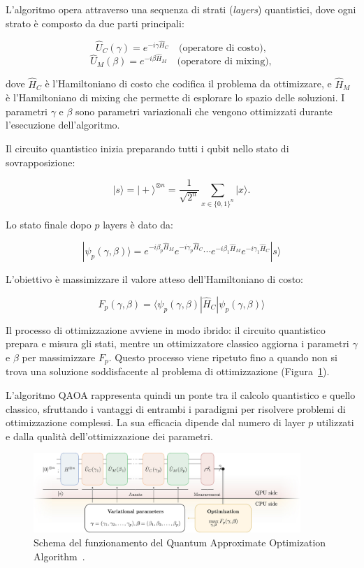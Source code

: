 L'algoritmo opera attraverso una sequenza di strati (\textit{layers}) quantistici, 
dove ogni strato è composto da due parti principali:

\begin{equation}
   \hat{U}_C(\gamma) = e^{-i\gamma \hat{H}_C} \quad \text{(operatore di costo)},
\end{equation}
\begin{equation}    
   \hat{U}_M(\beta) = e^{-i\beta \hat{H}_M} \quad \text{(operatore di mixing)},
\end{equation}

dove $\hat{H}_C$ è l'Hamiltoniano di costo che codifica il problema da ottimizzare, 
e $\hat{H}_M$ è l'Hamiltoniano di mixing che permette di esplorare lo spazio delle 
soluzioni. I parametri $\gamma$ e $\beta$ sono parametri variazionali che vengono 
ottimizzati durante l'esecuzione dell'algoritmo.

Il circuito quantistico inizia preparando tutti i qubit nello stato di sovrapposizione:

\begin{equation}
   |s\rangle = |+\rangle^{\otimes n} = \frac{1}{\sqrt{2^n}}\sum_{x\in\{{0,1\}}^n} |x\rangle.
\end{equation}

Lo stato finale dopo $p$ layers è dato da:

\begin{equation}
   |\psi_p(\gamma, \beta)\rangle = e^{-i\beta_p \hat{H}_M} e^{-i\gamma_p \hat{H}_C} \cdots e^{-i\beta_1 \hat{H}_M} e^{-i\gamma_1 \hat{H}_C} |s\rangle
\end{equation}

L'obiettivo è massimizzare il valore atteso dell'Hamiltoniano di costo:

\begin{equation}
   F_p(\gamma, \beta) = \langle\psi_p(\gamma, \beta)| \hat{H}_C |\psi_p(\gamma, \beta)\rangle
\end{equation}

Il processo di ottimizzazione avviene in modo ibrido: il circuito quantistico prepara e 
misura gli stati, mentre un ottimizzatore classico aggiorna i parametri $\gamma$ e $\beta$ 
per massimizzare $F_p$. Questo processo viene ripetuto fino a quando non si trova una 
soluzione soddisfacente al problema di ottimizzazione (Figura~\ref{fig:circuitoQAOA}).

L'algoritmo QAOA rappresenta quindi un ponte tra il calcolo quantistico e quello classico, 
sfruttando i vantaggi di entrambi i paradigmi per risolvere problemi di ottimizzazione 
complessi. La sua efficacia dipende dal numero di layer $p$ utilizzati e dalla qualità 
dell'ottimizzazione dei parametri.


\begin{figure}[h!]
    \centering
    \includegraphics[width=0.9\textwidth]{images/qaoa.jpg}
    \caption{Schema del funzionamento del Quantum Approximate Optimization Algorithm~\cite{blekos2024review}.}
    \label{fig:circuitoQAOA}
\end{figure}